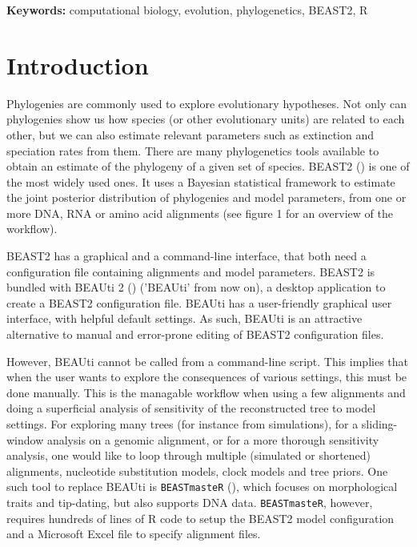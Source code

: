 {\bf Keywords:} computational biology, evolution, phylogenetics, BEAST2, R

\section{Introduction}

Phylogenies are commonly used to explore evolutionary hypotheses.
Not only can phylogenies show us how species (or other
evolutionary units) are related to each other, 
but we can also estimate relevant parameters such as extinction and 
speciation rates from them.
There are many phylogenetics tools available to obtain an estimate 
of the phylogeny of a given set of species. 
BEAST2 (\cite{bouckaert2014beast}) is one of the most widely used ones.
It uses a Bayesian statistical framework to estimate 
the joint posterior distribution of phylogenies and model parameters, 
from one or more DNA, RNA or amino acid alignments (see figure 1 
for an overview of the workflow). 

BEAST2 has a graphical and a command-line interface, 
that both need a configuration file containing 
alignments and model parameters.
BEAST2 is bundled with BEAUti 2 (\cite{drummond2012bayesian}) ('BEAUti' from now on), 
a desktop application to create a BEAST2 configuration file.
BEAUti has a user-friendly graphical user interface, with helpful
default settings.
As such, BEAUti is an attractive alternative 
to manual and error-prone editing of BEAST2 configuration files. 

However, BEAUti cannot be called from a command-line script.
This implies that when the user 
wants to explore the consequences of various settings, this must be done manually.
This is the managable workflow when using a few alignments and doing a superficial 
analysis of sensitivity of the reconstructed tree to model settings. 
For exploring many trees (for instance from simulations), 
for a sliding-window analysis on a genomic alignment, 
or for a more thorough sensitivity analysis, one would like to loop through 
multiple (simulated or shortened) alignments, nucleotide substitution models, 
clock models and tree priors. 
One such tool to replace BEAUti is \verb;BEASTmasteR; (\cite{beastmaster}),
which focuses on morphological traits and tip-dating, but also 
supports DNA data. \verb;BEASTmasteR;, however, requires hundreds of
lines of R code to setup the BEAST2 model configuration 
and a Microsoft Excel file to specify alignment files.


